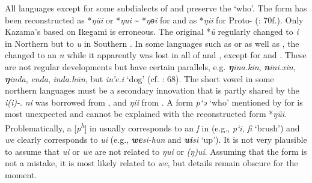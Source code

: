 All languages except for some subdialects of  and  preserve the  ‘who’. The form has been reconstructed as *\textit{ŋüi} \citep[115]{Benzing1956} or *\textit{ŋui} {\textasciitilde} *\textit{ŋɵi} \citep[68]{Kazama2003} for  and as *\textit{ŋii} for Proto- (\citealt{Janhunen1991}: 70f.). Only Kazama’s  based on Ikegami is erroneous. The original *\textit{ü} regularly changed to \textit{i} in Northern but to \textit{u} in Southern . In some  languages such as  or  as well as , the  changed to an \textit{n} while it apparently was lost in all of  and , except for  and . These are not regular developments but have certain parallels, e.g.  \textbf{\textit{ŋ}}\textit{ina.kin},  \textbf{\textit{n}}\textit{ini.xin},  \textbf{\textit{ŋ}}\textit{inda},  \textit{enda},  \textit{inda.h\=u}\textit{n}, but  \textit{in’e.i} ‘dog’ (cf. \citealt{Benzing1956}: 68). The short vowel in some northern  languages must be a secondary innovation that is partly shared by the  \textit{i(i)-}.  \textit{ni} was borrowed from , and  \textit{ŋii} from . A form \textit{p‘ə} ‘who’ mentioned by \citet[14]{MuYejun1986} for  is most unexpected and cannot be explained with the reconstructed form *\textit{ŋüi}. Problematically, a [\textit{p\textsuperscript{h}}] in  usually corresponds to an \textit{f} in  (e.g.,  \textit{p‘i},  \textit{fi} ‘brush’) and  \textit{we} clearly corresponds to  \textit{ui} (e.g.,  \textbf{\textit{we}}\textit{si-hun} and  \textbf{\textit{ui}}\textit{si} ‘up’). It is not very plausible to assume that  \textit{ui} or  \textit{we} are not related to  \textit{ŋui} or  \textit{(ŋ)ui}. Assuming that the  form is not a mistake, it is most likely related to  \textit{we}, but details remain obscure for the moment.

